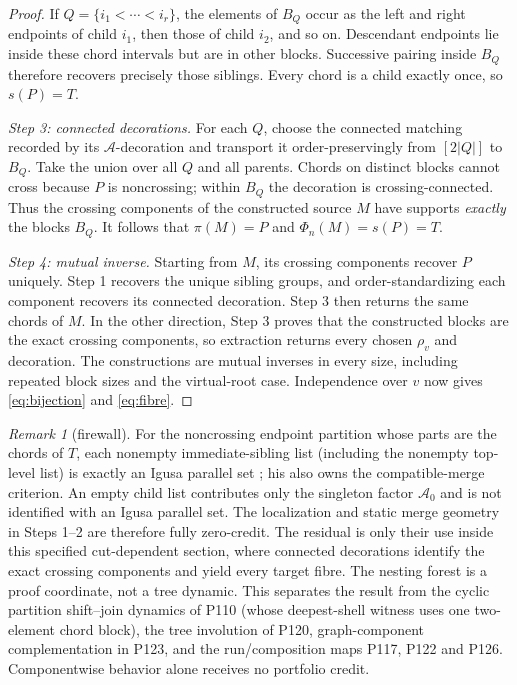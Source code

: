 \documentclass[10pt,a4paper]{amsart}
\theoremstyle{definition}
\theoremstyle{remark}
\newtheorem{remark}[theorem]{Remark}
\begin{document}
\begin{proof}
If $Q=\{i_1<\cdots<i_r\}$, the elements of $B_Q$ occur as the left and
right endpoints of child $i_1$, then those of child $i_2$, and so on.
Descendant endpoints lie inside these chord intervals but are in other
blocks.  Successive pairing inside $B_Q$ therefore recovers precisely those
siblings.  Every chord is a child exactly once, so $s(P)=T$.

\smallskip
\noindent\emph{Step 3: connected decorations.}
For each $Q$, choose the connected matching recorded by its
$\mathcal A$-decoration and transport it order-preservingly from
$[2|Q|]$ to $B_Q$.  Take the union over all $Q$ and all parents.  Chords on
distinct blocks cannot cross because $P$ is noncrossing; within $B_Q$ the
decoration is crossing-connected.  Thus the crossing components of the
constructed source $M$ have supports \emph{exactly} the blocks $B_Q$.
It follows that $\pi(M)=P$ and $\Phi_n(M)=s(P)=T$.

\smallskip
\noindent\emph{Step 4: mutual inverse.}
Starting from $M$, its crossing components recover $P$ uniquely.  Step 1
recovers the unique sibling groups, and order-standardizing each component
recovers its connected decoration.  Step 3 then returns the same chords of
$M$.  In the other direction, Step 3 proves that the constructed blocks are
the exact crossing components, so extraction returns every chosen
$\rho_v$ and decoration.  The constructions are mutual inverses in every
size, including repeated block sizes and the virtual-root case.  Independence
over $v$ now gives \eqref{eq:bijection} and \eqref{eq:fibre}.
\end{proof}

\begin{remark}[firewall]
For the noncrossing endpoint partition whose parts are the chords of $T$,
each nonempty immediate-sibling list (including the nonempty top-level list)
is exactly an Igusa parallel set \cite[Definition~1.7]{Igusa2025}; his
\cite[Proposition~1.8]{Igusa2025} also owns the compatible-merge criterion.
An empty child list contributes only the singleton factor $\mathcal A_0$ and
is not identified with an Igusa parallel set.  The localization and static
merge geometry in Steps 1--2 are therefore fully zero-credit.  The residual
is only their use inside this specified cut-dependent section, where
connected decorations identify the exact crossing components and yield every
target fibre.  The nesting forest is a proof coordinate, not a tree dynamic.
This separates the result from the cyclic partition shift--join dynamics of
P110 (whose deepest-shell witness uses one two-element chord block), the tree
involution of P120, graph-component complementation in P123, and the
run/composition maps P117, P122 and P126.
Componentwise behavior alone receives no portfolio credit.
\end{remark}
\end{document}

